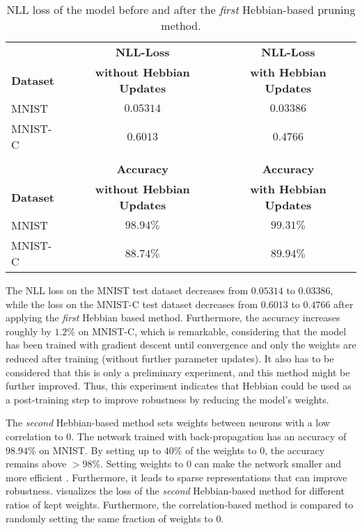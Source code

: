 \begin{table}[h] 
    \centering
	 \begin{tabular}{l c c} 
    	 & \textbf{NLL-Loss} & \textbf{NLL-Loss} \\
        \textbf{Dataset} & \textbf{without Hebbian Updates} & \textbf{with Hebbian Updates}\\
        \hline
        MNIST & \(0.05314\) & \(0.03386\) \\
        MNIST-C & \(0.6013\) & \(0.4766\) \\
         & & \\
    	 &\textbf{Accuracy} & \textbf{Accuracy} \\
        \textbf{Dataset} & \textbf{without Hebbian Updates }& \textbf{with Hebbian Updates}\\
        \hline
        MNIST & \(98.94\%\) & \(99.31\%\) \\
        MNIST-C & \(88.74\%\) & \(89.94\%\) \\
    \end{tabular}
    \caption[NLL Loss of Hebbian Pruning Network]{NLL loss of the model before and after the \emph{first} Hebbian-based pruning method.}
\end{table}

The NLL loss on the MNIST test dataset decreases from \(0.05314\) to \(0.03386\), while the loss on the MNIST-C test dataset decreases from \(0.6013\) to \(0.4766\) after applying the \emph{first} Hebbian based method.
Furthermore, the accuracy increases roughly by $1.2\%$ on MNIST-C, which is remarkable, considering that the model has been trained with gradient descent until convergence and only the weights are reduced after training (without further parameter updates).
It also has to be considered that this is only a preliminary experiment, and this method might be further improved.
Thus, this experiment indicates that Hebbian could be used as a post-training step to improve robustness by reducing the model's weights.

The \emph{second} Hebbian-based method sets weights between neurons with a low correlation to \(0\).
The network trained with back-propagation has an accuracy of \(98.94\%\) on MNIST.
By setting up to \(40\%\) of the weights to \(0\), the accuracy remains above \(>98\%\).
Setting weights to \(0\) can make the network smaller and more efficient .
Furthermore, it leads to sparse representations that can improve robustness.
 visualizes the loss of the \emph{second} Hebbian-based method for different ratios of kept weights.
Furthermore, the correlation-based method is compared to randomly setting the same fraction of weights to \(0\).

